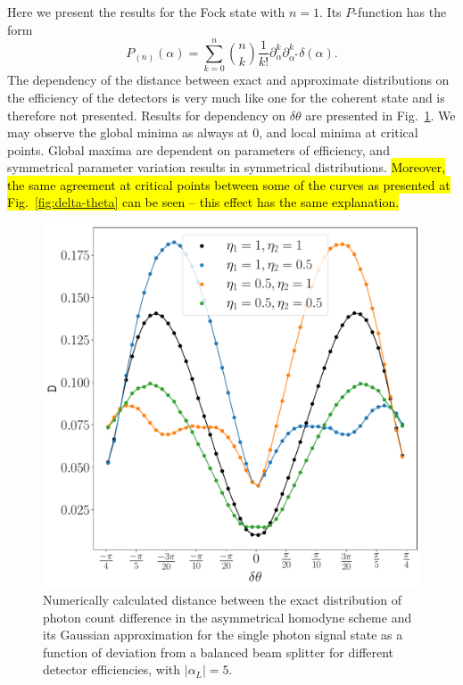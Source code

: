 Here we present the results for the Fock state with $n=1$. Its $P$-function has the form \cite{vogel2006quantum}
\begin{equation}
    P_{(n)}(\alpha)=
    \sum_{k=0}^n \binom{n}{k}\frac{1}{k!} \partial_{\alpha}^k\partial^k_{\alpha^*}\delta(\alpha).
\end{equation}
The dependency of the distance between exact and approximate distributions on the efficiency of the detectors is very much like one for the coherent state and is therefore not presented. Results for dependency on $\delta\theta$ are presented in Fig.~\ref{fig:fock}. We may observe the global minima as always at $0$, and local minima at critical points. 
Global maxima are dependent on parameters of efficiency, and symmetrical parameter variation results in symmetrical distributions. \hl{Moreover, the same agreement at critical points between some of the curves as presented at Fig.{~\ref{fig:delta-theta}} can be seen -- this effect has the same explanation.} 
\begin{figure}
    \centering
    \includegraphics[width=0.75\linewidth]{pics/homodyne/fock.pdf}
    \caption{Numerically calculated distance between the exact distribution of photon count difference in the asymmetrical homodyne scheme and its Gaussian approximation for the single photon signal state as a function of deviation from a balanced beam splitter for different detector efficiencies, with $|\alpha_L|=5$. }%
    \label{fig:fock}
\end{figure}